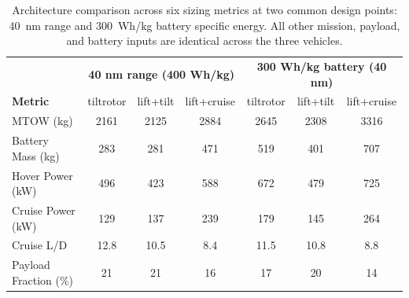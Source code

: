 \begin{table}[t]
\centering
\caption{Architecture comparison across six sizing metrics at two common design points: 40~nm range and 300~Wh/kg battery specific energy. All other mission, payload, and battery inputs are identical across the three vehicles.}
\label{tab:ts_comparison}
\small
\begin{tabular}{l c c c | c c c}
\hline
 & \multicolumn{3}{c|}{\textbf{40 nm range (400 Wh/kg)}} & \multicolumn{3}{c}{\textbf{300 Wh/kg battery (40 nm)}} \\
\textbf{Metric} & tiltrotor & lift+tilt & lift+cruise & tiltrotor & lift+tilt & lift+cruise \\
\hline
MTOW (kg) & 2161 & 2125 & 2884 & 2645 & 2308 & 3316 \\
Battery Mass (kg) & 283 & 281 & 471 & 519 & 401 & 707 \\
Hover Power (kW) & 496 & 423 & 588 & 672 & 479 & 725 \\
Cruise Power (kW) & 129 & 137 & 239 & 179 & 145 & 264 \\
Cruise L/D & 12.8 & 10.5 & 8.4 & 11.5 & 10.8 & 8.8 \\
Payload Fraction (\%) & 21 & 21 & 16 & 17 & 20 & 14 \\
\hline
\end{tabular}
\end{table}
